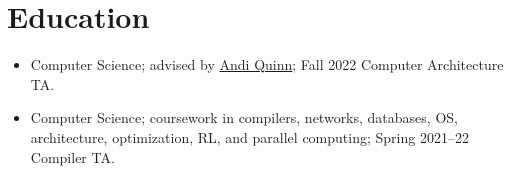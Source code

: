\documentclass{resume}
\newcommand{\en}[1]{#1}
\newcommand{\zh}[1]{}
\begin{document}
\name{\en{Yiwei Yang}\zh{杨易为}}


\section{\en{Education}\zh{教育经历}}
\en{}
\zh{\datedsubsection{\textbf{加州大学圣克鲁兹分校}, 在读Ph.D.}{2022/09 -- 2028/06}}
\begin{itemize}
      \item \en{Computer Science; advised by \href{https://arquinn.github.io/}{Andi Quinn}; Fall 2022 Computer Architecture TA.}
            \zh{计算机科学，导师为\href{https://arquinn.github.io/}{Andi Quinn}，2022秋体系结构助教}
\end{itemize}
\en{}
\zh{\datedsubsection{\textbf{上海科技大学}, 本科}{2018/09 -- 2022/06}}
\begin{itemize}
      \item \en{Computer Science; coursework in compilers, networks, databases, OS, architecture, optimization, RL, and parallel computing; Spring 2021--22 Compiler TA.}
            \zh{计算机科学，完成编译原理，操作系统，网络，数据库，并行计算，凸优化，强化学习等课程，2021\&22春编译原理助教}
\end{itemize}
\end{document}
